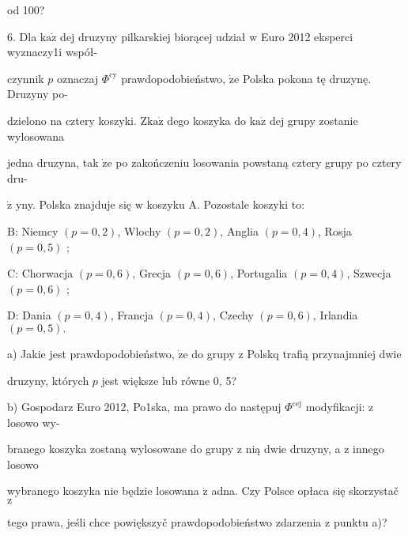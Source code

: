 \documentclass[a4paper,12pt]{article}
\begin{document}
od 100?

6. Dla $\mathrm{k}\mathrm{a}\dot{\mathrm{z}}$ dej druzyny pilkarskiej biorącej udział $\mathrm{w}$ Euro 2012 eksperci wyznaczy1i współ-

czynnik $p$ oznaczaj $\Phi^{\mathrm{c}\mathrm{y}}$ prawdopodobieństwo, $\dot{\mathrm{z}}\mathrm{e}$ Polska pokona tę druzynę. Druzyny po-

dzielono na cztery koszyki. $\mathrm{Z} \mathrm{k}\mathrm{a}\dot{\mathrm{z}}$ dego koszyka do $\mathrm{k}\mathrm{a}\dot{\mathrm{z}}$ dej grupy zostanie wylosowana

jedna druzyna, tak $\dot{\mathrm{z}}\mathrm{e}$ po zakończeniu losowania powstaną cztery grupy po cztery dru-

$\dot{\mathrm{z}}$ yny. Polska znajduje się $\mathrm{w}$ koszyku A. Pozostale koszyki to:

$\mathrm{B}$: Niemcy $(p=0,2)$, Wlochy $(p=0,2)$, Anglia $(p=0,4)$, Rosja $(p=0,5)$ ;

$\mathrm{C}$: Chorwacja $(p=0,6)$, Grecja $(p=0,6)$, Portugalia $(p=0,4)$, Szwecja $(p=0,6)$ ;

$\mathrm{D}$: Dania $(p=0,4)$, Francja $(p=0,4)$, Czechy $(p=0,6)$, Irlandia $(p=0,5).$

a) Jakie jest prawdopodobieństwo, $\dot{\mathrm{z}}\mathrm{e}$ do grupy $\mathrm{z}$ Polskq trafią przynajmniej dwie

druzyny, których $p$ jest większe lub równe 0, 5?

b) Gospodarz Euro 2012, Po1ska, ma prawo do następuj $\Phi^{\mathrm{c}\mathrm{e}\mathrm{j}}$ modyfikacji: $\mathrm{z}$ losowo wy-

branego koszyka zostaną wylosowane do grupy $\mathrm{z}$ nią dwie druzyny, a $\mathrm{z}$ innego losowo

wybranego koszyka nie będzie losowana $\dot{\mathrm{z}}$ adna. Czy Polsce opłaca się skorzystač $\mathrm{z}$

tego prawa, jeśli chce powiększyč prawdopodobieństwo zdarzenia $\mathrm{z}$ punktu a)?
\end{document}
